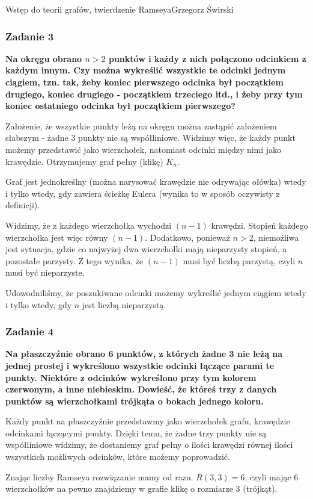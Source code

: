 \begin{referat}{Wstęp do teorii grafów, twierdzenie Ramseya}{Grzegorz Świrski}
\subsubsection{Zadanie 3}
\textbf{Na okręgu obrano $n>2$ punktów i każdy z nich połączono odcinkiem z każdym innym. Czy można wykreślić wszystkie te odcinki jednym ciągiem, tzn. tak, żeby koniec pierwszego odcinka był początkiem drugiego, koniec drugiego - początkiem trzeciego itd., i żeby przy tym koniec ostatniego odcinka był początkiem pierwszego?}

Założenie, że wszystkie punkty leżą na okręgu można zastąpić założeniem słabszym - żadne 3 punkty nie są współliniowe. Widzimy więc, że każdy punkt możemy przedstawić jako wierzchołek, natomiast odcinki między nimi jako krawędzie. Otrzymujemy graf pełny (klikę) $K_n$.

Graf jest jednokreślny (można narysować krawędzie nie odrywając ołówka) wtedy i tylko wtedy, gdy zawiera ścieżkę Eulera (wynika to w sposób oczywisty z definicji).

Widzimy, że z każdego wierzchołka wychodzi $(n-1)$ krawędzi. Stopień każdego wierzchołka jest więc równy $(n-1)$. Dodatkowo, ponieważ $n > 2$, niemożliwa jest sytuacja, gdzie co najwyżej dwa wierzchołki mają nieparzysty stopień, a pozostałe parzysty. Z tego wynika, że $(n - 1)$ musi być liczbą parzystą, czyli $n$ musi być nieparzyste.

Udowodniliśmy, że poszukiwane odcinki możemy wykreślić jednym ciągiem wtedy i tylko wtedy, gdy $n$ jest liczbą nieparzystą.\\


\subsubsection{Zadanie 4}
\textbf{Na płaszczyźnie obrano 6 punktów, z których żadne 3 nie leżą na jednej prostej i wykreślono wszystkie odcinki łączące parami te punkty. Niektóre z odcinków wykreślono przy tym kolorem czerwonym, a inne niebieskim. Dowieść, że któreś trzy z danych punktów są wierzchołkami trójkąta o bokach jednego koloru.}

Każdy punkt na płaszczyźnie przedstawmy jako wierzchołek grafu, krawędzie odcinkami łączącymi punkty. Dzięki temu, że żadne trzy punkty nie są współliniowe widzimy, że dostaniemy graf pełny o ilości krawędzi równej ilości wszystkich możliwych odcinków, które możemy poprowadzić.

Znając liczby Ramseya rozwiązanie mamy od razu. $R(3,3) = 6$, czyli mając 6 wierzchołków na pewno znajdziemy w grafie klikę o rozmiarze 3 (trójkąt).


\end{referat}
